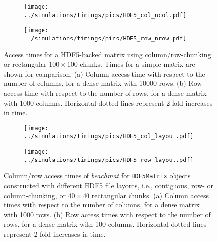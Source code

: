 \documentclass{article}
\newcommand{\beachmat}{\textit{beachmat}}
\newcommand{\code}[1]{\texttt{#1}}
\begin{document}
\begin{figure}[bt]
    \begin{subfigure}[b]{0.49\textwidth}
        \texttt{[image: ../simulations/timings/pics/HDF5\_col\_ncol.pdf]}
        \caption{}
    \end{subfigure}
    \begin{subfigure}[b]{0.49\textwidth}
        \texttt{[image: ../simulations/timings/pics/HDF5\_row\_nrow.pdf]}
        \caption{}
    \end{subfigure}
    \caption{Access times for a HDF5-backed matrix using column/row-chunking or rectangular $100\times100$ chunks.
        Times for a simple matrix are shown for comparison.
        (a) Column access time with respect to the number of columns, for a dense matrix with 10000 rows.
        (b) Row access time with respect to the number of rows, for a dense matrix with 1000 columns.
        Horizontal dotted lines represent 2-fold increases in time.
    }
    \label{fig:hdf5time}
\end{figure}

\begin{figure}[bt]
    \begin{subfigure}[b]{0.49\textwidth}
        \texttt{[image: ../simulations/timings/pics/HDF5\_col\_layout.pdf]}
        \caption{}
    \end{subfigure}
    \begin{subfigure}[b]{0.49\textwidth}
        \texttt{[image: ../simulations/timings/pics/HDF5\_row\_layout.pdf]}
        \caption{}
    \end{subfigure}
    \caption{Column/row access times of \beachmat{} for \code{HDF5Matrix} objects constructed with different HDF5 file layouts, 
        i.e., contiguous, row- or column-chunking, or $40\times40$ rectangular chunks.
        (a) Column access times with respect to the number of columns, for a dense matrix with 1000 rows.
        (b) Row access times with respect to the number of rows, for a dense matrix with 100 columns.
        Horizontal dotted lines represent 2-fold increases in time.
    }
    \label{fig:hdf5layout}
\end{figure}
\end{document}
